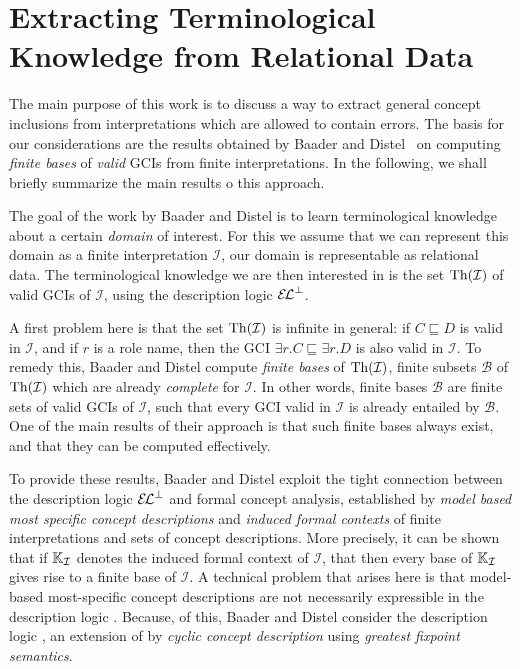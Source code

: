 \section{Extracting Terminological Knowledge from Relational Data}
\label{sec:extr-term-knowl}

The main purpose of this work is to discuss a way to extract general concept inclusions
from interpretations which are allowed to contain errors.  The basis for our
considerations are the results obtained by Baader and
Distel~\cite{Diss-Felix,BaDi09,BaaderDistel08} on computing \emph{finite bases} of
\emph{valid} GCIs from finite interpretations.  In the following, we shall briefly
summarize the main results o this approach.

The goal of the work by Baader and Distel is to learn terminological knowledge about a
certain \emph{domain} of interest.  For this we assume that we can represent this domain
as a finite interpretation $\mathcal{I}$, \ie our domain is representable as relational
data.  The terminological knowledge we are then interested in is the set
$\operatorname{Th}(\mathcal{I})$ of valid GCIs of $\mathcal{I}$, using the description logic ${{\mathcal{E}\kern-.3ex\mathcal{L}}^\bot}$.

A first problem here is that the set $\operatorname{Th}(\mathcal{I})$ is infinite in general: if $C
\sqsubseteq D$ is valid in $\mathcal{I}$, and if $r$ is a role name, then the GCI $\exists
r. C \sqsubseteq \exists r. D$ is also valid in $\mathcal{I}$.  To remedy this, Baader and
Distel compute \emph{finite bases} of $\operatorname{Th}(\mathcal{I})$, \ie finite subsets $\mathcal{B}$
of $\operatorname{Th}(\mathcal{I})$ which are already \emph{complete} for $\mathcal{I}$.  In other
words, finite bases $\mathcal{B}$ are finite sets of valid GCIs of $\mathcal{I}$, such
that every GCI valid in $\mathcal{I}$ is already entailed by $\mathcal{B}$.  One of the
main results of their approach is that such finite bases always exist, and that they can
be computed effectively.

To provide these results, Baader and Distel exploit the tight connection between the
description logic ${{\mathcal{E}\kern-.3ex\mathcal{L}}^\bot}$ and formal concept analysis, established by \emph{model based
  most specific concept descriptions} and \emph{induced formal contexts} of finite
interpretations and sets of concept descriptions.  More precisely, it can be shown that if
${\mathbb{K}}_{\mathcal{I}}$ denotes the induced formal context of $\mathcal{I}$, that then
every base of ${\mathbb{K}}_{\mathcal{I}}$ gives rise to a finite base of $\mathcal{I}$.  A
technical problem that arises here is that model-based most-specific concept descriptions
are not necessarily expressible in the description logic \ELbot.  Because, of this, Baader
and Distel consider the description logic \ELgfpbot, an extension of \ELbot by
\emph{cyclic concept description} using \emph{greatest fixpoint semantics}.


